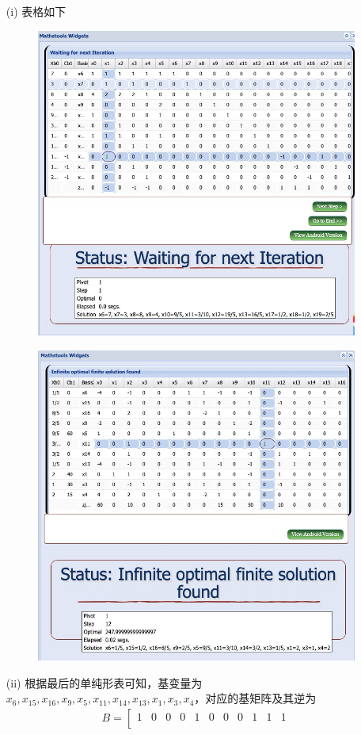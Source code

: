\documentclass[10pt]{article}
\begin{document}
\begin{itemize}
	\item [(i)] 表格如下
	\begin{figure}[H]
	\centering
	\includegraphics[width=0.7\linewidth]{p2-1.jpg}
	\label{fig.prob2}
\end{figure}
\begin{figure}[H]
	\centering
	\includegraphics[width=0.7\linewidth]{p2-2.jpg}
	\label{fig.prob2}
\end{figure}
	\item [(ii)] 根据最后的单纯形表可知，基变量为$x_6,x_{15},x_{16},x_9,x_5,x_{11},x_{14},x_{13},x_1,x_3,x_4$，对应的基矩阵及其逆为
	{\footnotesize
    \begin{align*}B=\left[
\begin{array}{ccccccccccc}
	1 & 0 & 0 & 0 & 1 & 0 & 0 & 0 & 1 & 1 & 1 \\ 

\end{array}
\end{align*}}
\end{itemize}
\end{document}
